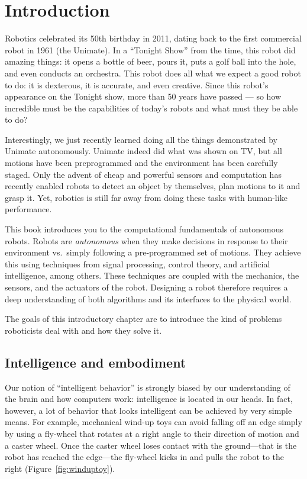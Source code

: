 \chapter{Introduction}\label{chap:introduction}
Robotics celebrated its 50th birthday in 2011, dating back to the first commercial robot in 1961 (the Unimate). In a ``Tonight Show'' from the time, this robot did amazing things: it opens a bottle of beer, pours it, puts a golf ball into the hole, and even conducts an orchestra. This robot does all what we expect a good robot to do: it is dexterous, it is accurate, and even creative. Since this robot's appearance on the Tonight show, more than 50 years have passed --- so how incredible must be the capabilities of today's robots and what must they be able to do?

Interestingly, we just recently learned doing all the things demonstrated by Unimate autonomously. Unimate indeed did what was shown on TV, but all motions have been preprogrammed and the environment has been carefully staged.  Only the advent of cheap and powerful sensors and computation has recently enabled robots to detect an object by themselves, plan motions to it and grasp it. Yet, robotics is still far away from doing these tasks with human-like performance.

This book introduces you to the computational fundamentals of autonomous robots. Robots are \emph{autonomous} when they make decisions in response to their environment vs.\ simply following a pre-programmed set of motions. They achieve this using techniques from signal processing, control theory, and artificial intelligence, among others. These techniques are coupled with the mechanics, the sensors, and the actuators of the robot. Designing a robot therefore requires a deep understanding of both algorithms and its interfaces to the physical world.

The goals of this introductory chapter are to introduce the kind of problems roboticists deal with and how they solve it.

\section{Intelligence and embodiment}
Our notion of ``intelligent behavior'' is strongly biased by our understanding of the brain and how computers work: intelligence is located in our heads. In fact, however, a lot of behavior that looks intelligent can be achieved by very simple means. For example, mechanical wind-up toys can avoid falling off an edge simply by using a fly-wheel that rotates at a right angle to their direction of motion and a caster wheel. Once the caster wheel loses contact with the ground---that is the robot has reached the edge---the fly-wheel kicks in and pulls the robot to the right (Figure~\ref{fig:winduptoy}).

